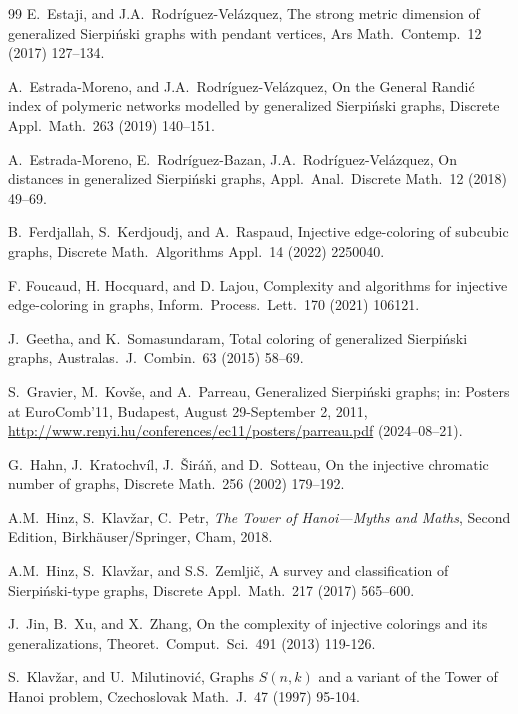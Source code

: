 \documentclass{article}
\begin{document}
\begin{thebibliography}{99}
 E.~Estaji, and J.A.~Rodr\'{i}guez-Vel\'{a}zquez, The strong metric dimension of generalized Sierpi\'{n}ski graphs with pendant vertices, Ars Math.\ Contemp.\ 12 (2017) 127--134.

  A.~Estrada-Moreno, and J.A.~Rodr\'{i}guez-Vel\'{a}zquez,
On the General Randi\'{c} index of polymeric networks modelled by generalized Sierpi\'{n}ski graphs, Discrete Appl.\ Math.\ 263 (2019) 140--151.

 A.~Estrada-Moreno, E.~Rodr\'{i}guez-Bazan, J.A.~Rodr\'{i}guez-Vel\'{a}zquez,
On distances in generalized Sierpi\'{n}ski graphs,
Appl.\ Anal.\ Discrete Math.\ 12 (2018) 49--69.

 B.~Ferdjallah, S.~Kerdjoudj, and A.~Raspaud, Injective edge-coloring of subcubic graphs, Discrete Math.\ Algorithms Appl.\ 14 (2022) 2250040. 


 F. Foucaud, H. Hocquard, and D. Lajou, Complexity and algorithms for injective edge-coloring in graphs, Inform.\ Process.\ Lett.\ 170 (2021) 106121.

 J.~Geetha, and K.~Somasundaram, Total coloring of generalized Sierpiński graphs,
Australas.\ J.\ Combin.\ 63 (2015) 58--69.


 S.~Gravier, M.~Kov\v se, and A.~Parreau,  Generalized Sierpi\'nski graphs; in: Posters at EuroComb'11, Budapest, August 29-September 2, 2011, 
\url{http://www.renyi.hu/conferences/ec11/posters/parreau.pdf} (2024--08--21).

 G.~Hahn, J.~Kratochv\'{i}l, J.~\v{S}ir\'{a}\v{n}, and D.~Sotteau, On the injective chromatic number of graphs, Discrete Math.\  256 (2002) 179--192.

 A.M.~Hinz, S.~Klavžar, C.~Petr, {\em The Tower of Hanoi—Myths and Maths}, Second Edition, Birkhäuser/Springer, Cham, 2018.


 A.M.~Hinz, S.~Klav\v{z}ar, and S.S.~Zemlji\v{c},  A survey and classification of Sierpi\'nski-type graphs, Discrete Appl.\ Math.\ 217 (2017) 565--600. 


 J.~Jin, B.~Xu, and X.~Zhang, On the complexity of injective colorings and its generalizations, Theoret.\ Comput.\ Sci.\ 491 (2013) 119-126.


 S.~Klav\v zar, and U.~Milutinovi\'c, Graphs $S(n,k)$ and a variant of the Tower of Hanoi problem, Czechoslovak Math.\ J.\  47 (1997) 95-104.


\end{thebibliography}
\end{document}
